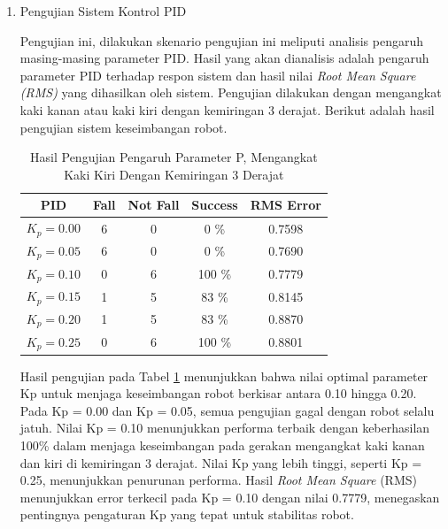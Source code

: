 \begin{enumerate}[label=\Alph*.]
    \item Pengujian Sistem Kontrol PID
    \label{subsec:hasil-pembahasan-pid}

        \hspace*{1em} Pengujian ini, dilakukan skenario pengujian ini meliputi analisis pengaruh masing-masing parameter PID. Hasil yang akan dianalisis adalah pengaruh parameter PID terhadap respon sistem dan hasil nilai \textit{Root Mean Square (RMS)} yang dihasilkan oleh sistem. Pengujian dilakukan dengan mengangkat kaki kanan atau kaki kiri dengan kemiringan 3 derajat. Berikut adalah hasil pengujian sistem keseimbangan robot.
        
        \begin{table}[h]
            \centering
            \caption{Hasil Pengujian Pengaruh Parameter P, Mengangkat Kaki Kiri Dengan Kemiringan 3 Derajat}
            \begin{tabular}{|c|c|c|c|c|}
                \hline
                \textbf{PID} & \textbf{Fall} & \textbf{Not Fall} & \textbf{Success} & RMS Error \\
                \hline
                $K_p = 0.00$ & 6 & 0 & 0   \% & 0.7598 \\
                $K_p = 0.05$ & 6 & 0 & 0   \% & 0.7690 \\
                $K_p = 0.10$ & 0 & 6 & 100 \% & 0.7779 \\
                $K_p = 0.15$ & 1 & 5 & 83  \% & 0.8145 \\
                $K_p = 0.20$ & 1 & 5 & 83  \% & 0.8870 \\
                $K_p = 0.25$ & 0 & 6 & 100 \% & 0.8801 \\            
                \hline
            \end{tabular}
            \label{tab:pengujian_p}
        \end{table}

        \hspace*{1em} Hasil pengujian pada Tabel \ref{tab:pengujian_p} menunjukkan bahwa nilai optimal parameter Kp untuk menjaga keseimbangan robot berkisar antara 0.10 hingga 0.20. Pada Kp = 0.00 dan Kp = 0.05, semua pengujian gagal dengan robot selalu jatuh. Nilai Kp = 0.10 menunjukkan performa terbaik dengan keberhasilan 100\% dalam menjaga keseimbangan pada gerakan mengangkat kaki kanan dan kiri di kemiringan 3 derajat. Nilai Kp yang lebih tinggi, seperti Kp = 0.25, menunjukkan penurunan performa. Hasil \textit{Root Mean Square} (RMS) menunjukkan error terkecil pada Kp = 0.10 dengan nilai 0.7779, menegaskan pentingnya pengaturan Kp yang tepat untuk stabilitas robot.


\end{enumerate}
